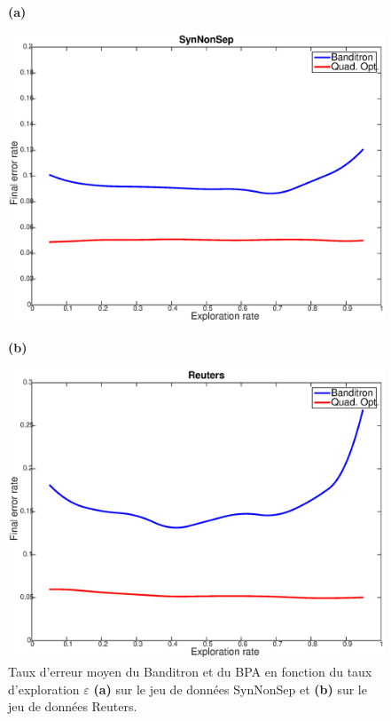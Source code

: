 \documentclass[preprint,12pt,authoryear]{elsarticle}
\begin{document}
\begin{figure}[htp]
	\centerline{\bf (a)}
	\centerline{\includegraphics[width=.9\linewidth]{figs/SynNonSep_gamma.eps}}
	\centerline{\bf (b)}
	\centerline{\includegraphics[width=.9\linewidth]{figs/Reuters_gamma.eps}}
	\caption{Taux d'erreur moyen du Banditron et du BPA en fonction du taux d'exploration $\varepsilon$ {\bf(a)} sur le jeu de données SynNonSep et {\bf(b)} sur le jeu de données Reuters. }
	\label{pic:BPASNSerr}

	
\end{figure}
\end{document}
